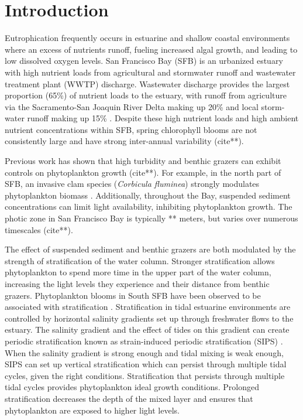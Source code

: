 \documentclass[preprint,review,12pt]{elsarticle}
\begin{document}
\section{Introduction}\label{S:intro}
Eutrophication frequently occurs in estuarine and shallow coastal environments where an excess of nutrients runoff, fueling increased algal growth, and leading to low dissolved oxygen levels. San Francisco Bay (SFB) is an urbanized estuary with high nutrient loads from agricultural and stormwater runoff and wastewater treatment plant (WWTP) discharge. Wastewater discharge provides the largest proportion (65\%) of nutrient loads to the estuary, with runoff from agriculture via the Sacramento-San Joaquin River Delta making up 20\% and local storm-water runoff making up 15\% \citep{novick2014}. Despite these high nutrient loads and high ambient nutrient concentrations within SFB, spring chlorophyll blooms are not consistently large and have strong inter-annual variability (cite**). 

Previous work has shown that high turbidity and benthic grazers can exhibit controls on phytoplankton growth (cite**). For example, in the north part of SFB, an invasive clam species (\textit{Corbicula fluminea}) strongly modulates phytoplankton biomass \citep{lucas2002, lopez2006}. Additionally, throughout the Bay, suspended sediment concentrations can limit light availability, inhibiting phytoplankton growth. The photic zone in San Francisco Bay is typically ** meters, but varies over numerous timescales (cite**).  

The effect of suspended sediment and benthic grazers are both modulated by the strength of stratification of the water column. Stronger stratification allows phytoplankton to spend more time in the upper part of the water column, increasing the light levels they experience and their distance from benthic grazers. Phytoplankton blooms in South SFB have been observed to be associated with stratification \citep{cloern1991}. Stratification in tidal estuarine environments are controlled by horizontal salinity gradients set up through freshwater flows to the estuary. The salinity gradient and the effect of tides on this gradient can create periodic stratification known as strain-induced periodic stratification (SIPS) \citep{simpson1990}. When the salinity gradient is strong enough and tidal mixing is weak enough, SIPS can set up vertical stratification which can persist through multiple tidal cycles, given the right conditions. Stratification that persists through multiple tidal cycles provides phytoplankton ideal growth conditions. Prolonged stratification decreases the depth of the mixed layer and ensures that phytoplankton are exposed to higher light levels. 
\end{document}
